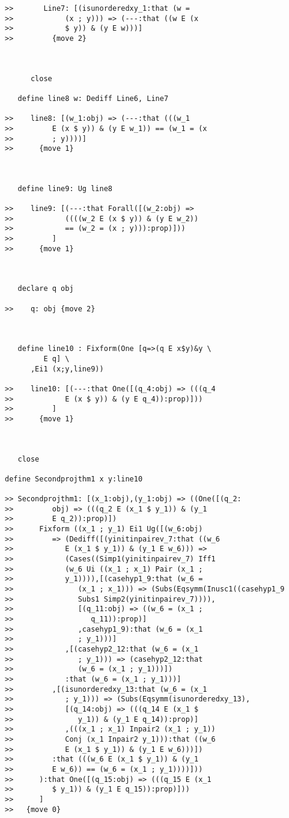 \documentclass[12pt]{article}
\begin{document}
\begin{verbatim}
>>       Line7: [(isunorderedxy_1:that (w =
>>            (x ; y))) => (---:that ((w E (x
>>            $ y)) & (y E w)))]
>>         {move 2}



      close

   define line8 w: Dediff Line6, Line7

>>    line8: [(w_1:obj) => (---:that (((w_1
>>         E (x $ y)) & (y E w_1)) == (w_1 = (x
>>         ; y))))]
>>      {move 1}



   define line9: Ug line8

>>    line9: [(---:that Forall([(w_2:obj) =>
>>            ((((w_2 E (x $ y)) & (y E w_2))
>>            == (w_2 = (x ; y))):prop)]))
>>         ]
>>      {move 1}



   declare q obj

>>    q: obj {move 2}



   define line10 : Fixform(One [q=>(q E x$y)&y \
         E q] \
      ,Ei1 (x;y,line9))

>>    line10: [(---:that One([(q_4:obj) => (((q_4
>>            E (x $ y)) & (y E q_4)):prop)]))
>>         ]
>>      {move 1}



   close

define Secondprojthm1 x y:line10

>> Secondprojthm1: [(x_1:obj),(y_1:obj) => ((One([(q_2:
>>         obj) => (((q_2 E (x_1 $ y_1)) & (y_1
>>         E q_2)):prop)])
>>      Fixform ((x_1 ; y_1) Ei1 Ug([(w_6:obj)
>>         => (Dediff([(yinitinpairev_7:that ((w_6
>>            E (x_1 $ y_1)) & (y_1 E w_6))) =>
>>            (Cases((Simp1(yinitinpairev_7) Iff1
>>            (w_6 Ui ((x_1 ; x_1) Pair (x_1 ;
>>            y_1)))),[(casehyp1_9:that (w_6 =
>>               (x_1 ; x_1))) => (Subs(Eqsymm(Inusc1((casehyp1_9
>>               Subs1 Simp2(yinitinpairev_7)))),
>>               [(q_11:obj) => ((w_6 = (x_1 ;
>>                  q_11)):prop)]
>>               ,casehyp1_9):that (w_6 = (x_1
>>               ; y_1)))]
>>            ,[(casehyp2_12:that (w_6 = (x_1
>>               ; y_1))) => (casehyp2_12:that
>>               (w_6 = (x_1 ; y_1)))])
>>            :that (w_6 = (x_1 ; y_1)))]
>>         ,[(isunorderedxy_13:that (w_6 = (x_1
>>            ; y_1))) => (Subs(Eqsymm(isunorderedxy_13),
>>            [(q_14:obj) => (((q_14 E (x_1 $
>>               y_1)) & (y_1 E q_14)):prop)]
>>            ,(((x_1 ; x_1) Inpair2 (x_1 ; y_1))
>>            Conj (x_1 Inpair2 y_1))):that ((w_6
>>            E (x_1 $ y_1)) & (y_1 E w_6)))])
>>         :that (((w_6 E (x_1 $ y_1)) & (y_1
>>         E w_6)) == (w_6 = (x_1 ; y_1))))]))
>>      ):that One([(q_15:obj) => (((q_15 E (x_1
>>         $ y_1)) & (y_1 E q_15)):prop)]))
>>      ]
>>   {move 0}


\end{verbatim}
\end{document}
